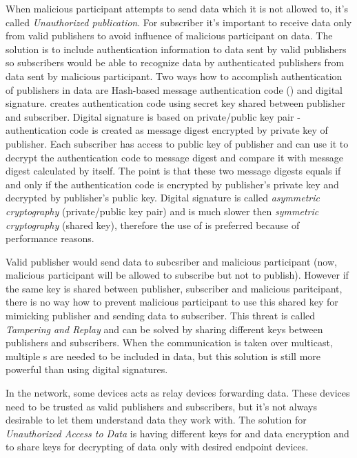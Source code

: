 When malicious participant attempts to send data which it is not allowed to, it's called {\em Unauthorized publication}. For subscriber it's important to receive data only from valid publishers to avoid influence of malicious participant on data. The solution is to include authentication information to data sent by valid publishers so subscribers would be able to recognize data by authenticated publishers from data sent by malicious participant. Two ways how to accomplish authentication of publishers in data are Hash-based message authentication code () and digital signature.  creates authentication code using secret key shared between publisher and subscriber. Digital signature is based on private/public key pair - authentication code is created as message digest encrypted by private key of publisher. Each subscriber has access to public key of publisher and can use it to decrypt the authentication code to message digest and compare it with message digest calculated by itself. The point is that these two message digests equals if and only if the authentication code is encrypted by publisher's private key and decrypted by publisher's public key. Digital signature is called {\em asymmetric cryptography} (private/public key pair) and is much slower then {\em symmetric cryptography} (shared key), therefore the use of  is preferred because of performance reasons.

Valid publisher would send data to subcsriber and malicious participant (now, malicious participant will be allowed to subscribe but not to publish). However if the same key is shared between publisher, subscriber and malicious paritcipant, there is no way how to prevent malicious participant to use this shared key for mimicking publisher and sending data to subscriber. This threat is called {\em Tampering and Replay} and can be solved by sharing different keys between publishers and subscribers. When the communication is taken over multicast, multiple s are needed to be included in data, but this solution is still more powerful than using digital signatures.

In the  network, some devices acts as relay devices forwarding data. These devices need to be trusted as valid publishers and subscribers, but it's not always desirable to let them understand data they work with. The solution for {\em Unauthorized Access to Data} is having different keys for  and data encryption and to share keys for decrypting of data only with desired endpoint devices.

